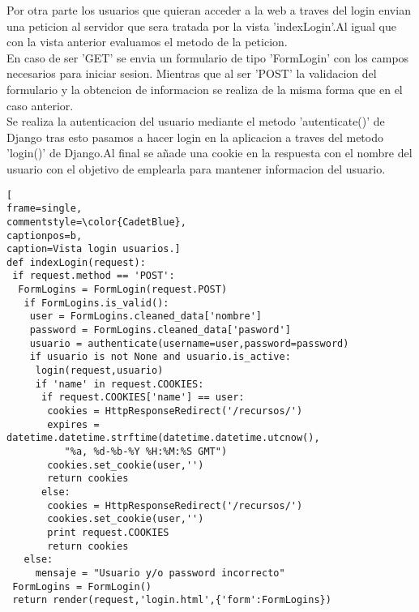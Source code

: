 Por otra parte los usuarios que quieran acceder a la web a traves del login envian una peticion al servidor que sera tratada por la vista 'indexLogin'.Al igual que con la vista anterior evaluamos el metodo de la peticion.
\\En caso de ser 'GET' se envia un formulario de tipo 'FormLogin' con los campos necesarios para iniciar sesion. Mientras que al ser 'POST' la validacion del formulario  y la obtencion de informacion se realiza de la misma forma que en el caso anterior.
\\Se realiza la autenticacion del usuario mediante el metodo 'autenticate()' de Django tras esto pasamos a hacer login en la aplicacion a traves del metodo 'login()' de Django.Al final se añade una  cookie en la respuesta con el nombre del usuario con el objetivo de emplearla para mantener informacion del usuario.
\begin{lstlisting}[
frame=single,
commentstyle=\color{CadetBlue},
captionpos=b,
caption=Vista login usuarios.]
def indexLogin(request):
 if request.method == 'POST':
  FormLogins = FormLogin(request.POST)
   if FormLogins.is_valid():
    user = FormLogins.cleaned_data['nombre']
    password = FormLogins.cleaned_data['pasword']
    usuario = authenticate(username=user,password=password) 
    if usuario is not None and usuario.is_active:
     login(request,usuario)
     if 'name' in request.COOKIES:
      if request.COOKIES['name'] == user:
       cookies = HttpResponseRedirect('/recursos/')
       expires = datetime.datetime.strftime(datetime.datetime.utcnow(), 
          "%a, %d-%b-%Y %H:%M:%S GMT")
       cookies.set_cookie(user,'')
       return cookies
      else:
       cookies = HttpResponseRedirect('/recursos/')
       cookies.set_cookie(user,'')
       print request.COOKIES
       return cookies
   else:
     mensaje = "Usuario y/o password incorrecto"
 FormLogins = FormLogin()
 return render(request,'login.html',{'form':FormLogins})
\end{lstlisting}

